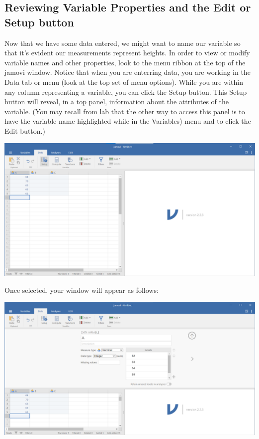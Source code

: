 \documentclass[
]{book}
\begin{document}
\hypertarget{reviewing-variable-properties-and-the-edit-or-setup-button}{%
\subsection{Reviewing Variable Properties and the Edit or Setup button}\label{reviewing-variable-properties-and-the-edit-or-setup-button}}

Now that we have some data entered, we might want to name our variable so that it's evident our measurements represent heights. In order to view or modify variable names and other properties, look to the menu ribbon at the top of the jamovi window. Notice that when you are enterring data, you are working in the {Data} tab or menu (look at the top set of menu options). While you are within any column representing a variable, you can click the {Setup} button. This {Setup} button will reveal, in a top panel, information about the attributes of the variable. (You may recall from lab that the other way to access this panel is to have the variable name highlighted while in the {Variables}) menu and to click the {Edit} button.)

\includegraphics{img/1.5.2.1A.png}

Once selected, your window will appear as follows:

\includegraphics{img/1.5.2.1B.png}
\end{document}
